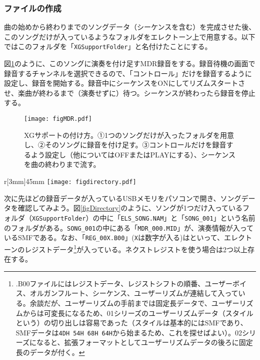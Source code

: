 \documentclass[uplatex, 10pt, dvipdfmx]{jsarticle}
\numberwithin{equation}{section}
\newcommand{\emphj}[1]{\textbf{\textrm{\textgt{{#1}}}}}
\begin{document}
\subsubsection{ファイルの作成}

曲の始めから終わりまでのソングデータ（シーケンスを含む）を完成させた後、このソングだけが入っているようなフォルダをエレクトーン上で用意する。以下ではこのフォルダを「\texttt{XGSupportFolder}」と名付けたことにする。

図\ref{figMDRrec}のように、このソングに演奏を付け足すMDR録音をする。録音待機の画面で録音するチャンネルを選択できるので、「コントロール」だけを録音するように設定し、録音を開始する。録音中にシーケンスをONにしてリズムスタートさせ、楽曲が終わるまで（演奏せずに）待つ。シーケンスが終わったら録音を停止する。

\begin{figure}[h]
  \centering
  \texttt{[image: figMDR.pdf]}
  \caption{XGサポートの付け方。①1つのソングだけが入ったフォルダを用意し、②そのソングに録音を付け足す。③コントロールだけを録音するよう設定し（他についてはOFFまたはPLAYにする）、シーケンスを曲の終わりまで流す。}
  \label{figMDRrec}
\end{figure}

\newpage

\begin{wrapfigure}[8]{r}[3mm]{45mm}
  \centering
  \texttt{[image: figdirectory.pdf]}
  \caption{ソング内の構造。}
  \label{figDirectory}
\end{wrapfigure}

次に先ほどの録音データが入っているUSBメモリをパソコンで開き、ソングデータを確認してみよう。図\ref{figDirectory}のように、ソングが1つだけ入っているフォルダ（\texttt{XGSupportFolder}）の中に「\texttt{ELS_SONG.NAM}」と「\texttt{SONG_001}」という名前のフォルダがある。\texttt{SONG_001}の中にある「\texttt{MDR_000.MID}」が、演奏情報が入っているSMFである。なお、「\texttt{REG_00X.B00}」(\texttt{X}は数字が入る)は\emphj{バルクファイル}といって、エレクトーンのレジストデータ\footnote{.B00ファイルにはレジストデータ、レジストシフトの順番、ユーザーボイス、オルガンフルート、シーケンス、ユーザーリズムが連結して入っている\cite{B00}。余談だが、ユーザーリズムの手前までは固定長データで、ユーザーリズムからは可変長になるため、01シリーズのユーザーリズムデータ（スタイルという）の切り出しは容易であった（スタイルは基本的にはSMFであり、SMFデータは\texttt{4DH 54H 68H 64H}から始まるため、これを探せばよい）。02シリーズになると、拡張フォーマットとしてユーザーリズムデータの後ろに固定長のデータが付く。}が入っている。ネクストレジストを使う場合は2つ以上存在する。
\end{document}
